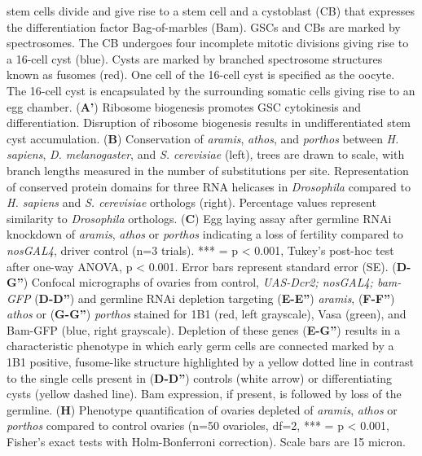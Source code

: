 \documentclass[12pt,oneside]{reedthesis}
\begin{document}
stem cells divide and give rise to a stem cell and a cystoblast (CB)
that expresses the differentiation factor Bag-of-marbles (Bam). GSCs and
CBs are marked by spectrosomes. The CB undergoes four incomplete mitotic
divisions giving rise to a 16-cell cyst (blue). Cysts are marked by
branched spectrosome structures known as fusomes (red). One cell of the
16-cell cyst is specified as the oocyte. The 16-cell cyst is
encapsulated by the surrounding somatic cells giving rise to an egg
chamber. (\textbf{A'}) Ribosome biogenesis promotes GSC cytokinesis and
differentiation. Disruption of ribosome biogenesis results in
undifferentiated stem cyst accumulation. (\textbf{B}) Conservation of
\emph{aramis}, \emph{athos}, and \emph{porthos} between \emph{H. sapiens}, \emph{D.
melanogaster}, and \emph{S. cerevisiae} (left), trees are drawn to scale,
with branch lengths measured in the number of substitutions per site.
Representation of conserved protein domains for three RNA helicases in
\emph{Drosophila} compared to \emph{H. sapiens} and \emph{S. cerevisiae} orthologs
(right). Percentage values represent similarity to \emph{Drosophila}
orthologs. (\textbf{C}) Egg laying assay after germline RNAi knockdown of
\emph{aramis}, \emph{athos} or \emph{porthos} indicating a loss of fertility compared
to \emph{nosGAL4}, driver control (n=3 trials). *** = p \textless{} 0.001, Tukey's
post-hoc test after one-way ANOVA, p \textless{} 0.001. Error bars represent
standard error (SE). (\textbf{D-G''}) Confocal micrographs of ovaries from
control, \emph{UAS-Dcr2; nosGAL4; bam-GFP} (\textbf{D-D''}) and germline RNAi
depletion targeting (\textbf{E-E''}) \emph{aramis}, (\textbf{F-F''}) \emph{athos} or
(\textbf{G-G''}) \emph{porthos} stained for 1B1 (red, left grayscale), Vasa
(green), and Bam-GFP (blue, right grayscale). Depletion of these genes
(\textbf{E-G''}) results in a characteristic phenotype in which early germ
cells are connected marked by a 1B1 positive, fusome-like structure
highlighted by a yellow dotted line in contrast to the single cells
present in (\textbf{D-D''}) controls (white arrow) or differentiating cysts
(yellow dashed line). Bam expression, if present, is followed by loss of
the germline. (\textbf{H}) Phenotype quantification of ovaries depleted of
\emph{aramis}, \emph{athos} or \emph{porthos} compared to control ovaries (n=50
ovarioles, df=2, *** = p \textless{} 0.001, Fisher's exact tests with
Holm-Bonferroni correction). Scale bars are 15 micron.

\textbf{\hfill\break
}
\end{document}
